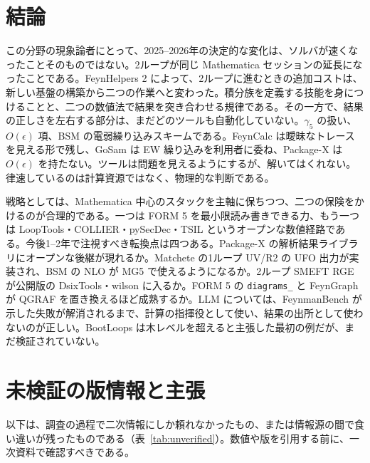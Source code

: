 \documentclass[a4paper,10pt]{ltjsarticle}
\begin{document}
\section{結論}\label{sec:conclusion}

この分野の現象論者にとって、2025--2026年の決定的な変化は、ソルバが速くなったことそのものではない。2ループが同じ Mathematica セッションの延長になったことである。FeynHelpers 2 によって、2ループに進むときの追加コストは、新しい基盤の構築から二つの作業へと変わった。積分族を定義する技能を身につけることと、二つの数値法で結果を突き合わせる規律である。その一方で、結果の正しさを左右する部分は、まだどのツールも自動化していない。$\gamma_5$ の扱い、$O(\epsilon)$ 項、BSM の電弱繰り込みスキームである。FeynCalc は曖昧なトレースを見える形で残し、GoSam は EW 繰り込みを利用者に委ね、Package-X は $O(\epsilon)$ を持たない。ツールは問題を見えるようにするが、解いてはくれない。律速しているのは計算資源ではなく、物理的な判断である。

戦略としては、Mathematica 中心のスタックを主軸に保ちつつ、二つの保険をかけるのが合理的である。一つは FORM 5 を最小限読み書きできる力、もう一つは LoopTools・COLLIER・pySecDec・TSIL というオープンな数値経路である。今後1--2年で注視すべき転換点は四つある。Package-X の解析結果ライブラリにオープンな後継が現れるか。Matchete の1ループ UV/R2 の UFO 出力が実装され、BSM の NLO が MG5 で使えるようになるか。2ループ SMEFT RGE が公開版の DsixTools・wilson に入るか。FORM 5 の \texttt{diagrams\_} と FeynGraph が QGRAF を置き換えるほど成熟するか。LLM については、FeynmanBench が示した失敗が解消されるまで、計算の指揮役として使い、結果の出所として使わないのが正しい。BootLoops は木レベルを超えると主張した最初の例だが、まだ検証されていない。


\appendix

\section{未検証の版情報と主張}\label{app:unverified}

以下は、調査の過程で二次情報にしか頼れなかったもの、または情報源の間で食い違いが残ったものである（表~\ref{tab:unverified}）。数値や版を引用する前に、一次資料で確認すべきである。
\end{document}
